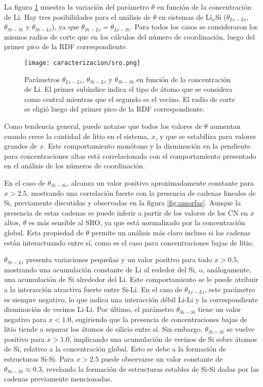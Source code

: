 La figura \ref{fig:sro} muestra la variación del parámetro $\theta$ en función 
de la concentración de Li. Hay tres posibilidades para el análisis de $\theta$ en
sistemas de Li$_x$Si ($\theta_{Li-Li}$, $\theta_{Si-Si}$ y $\theta_{Si-Li}$), ya
que $\theta_{Si-Li} = \theta_{Li-Si}$. Para todos los casos se consideraron los
mismos radios de corte que en los cálculos del número de coordinación, luego del
primer pico de la RDF correspondiente.
\begin{figure}[th]
    \centering
    \texttt{[image: caracterizacion/sro.png]}
    \caption{Parámetros $\theta_{Li-Li}$, $\theta_{Si-Li}$ y $\theta_{Si-Si}$ 
    en función de la concentración de Li. El primer subíndice indica el tipo de
    átomo que se considera como central mientras que el segundo es el vecino. El
    radio de corte se eligió luego del primer pico de la RDF correspondiente.}
    \label{fig:sro}
\end{figure}

Como tendencia general, puede notarse que todos los valores de $\theta$ aumentan
cuando crece la cantidad de litio en el sistema, $x$, y que se estabiliza para 
valores grandes de $x$. Este comportamiento monótono y la disminución en la 
pendiente para concentraciones altas está correlacionado con el comportamiento
presentado en el análisis de los números de coordinación.

En el caso de $\theta_{Si-Si}$, alcanza un valor positivo aproximadamente 
constante para $x > 2.5$, mostrando una correlación fuerte con la presencia de 
cadenas lineales de Si, previamente discutidas y observadas en la figura 
\ref{fig:amorfas}. Aunque la presencia de estas cadenas se puede inferir a partir
de los valores de los CN en $x$ altos, $\theta$ es más sensible al SRO, ya que
está normalizado por la concentración global. Esta propiedad de $\theta$ permite
un análisis más claro incluso si las cadenas están interactuando entre sí, como
es el caso para concentraciones bajas de litio.

$\theta_{Si-Li}$ presenta variaciones pequeñas y un valor positivo para todo 
$x > 0.5$, mostrando una acumulación constante de Li al rededor del Si, o, 
análogamente, una acumulación de Si alrededor del Li. Este comportamiento se le 
puede atribuir a la interacción atractiva fuerte entre Si-Li. En el caso de 
$\theta_{Li-Li}$, este parámetro es siempre negativo, lo que indica una 
interacción débil Li-Li y la correspondiente disminución de vecinos Li-Li. Por
último, el parámetro $\theta_{Si-Si}$ tiene un valor negativo para $x < 1.0$, 
sugiriendo que la presencia de concentraciones bajas de litio tiende a separar 
los átomos de silicio entre sí. Sin embargo, $\theta_{Si-Si}$ se vuelve positivo
para $x > 1.0$, implicando una acumulación de vecinos de Si sobre átomos de Si, 
relativo a la concentración global. Esto se debe a la formación de estructuras 
Si-Si. Para $x > 2.5$ puede observarse un valor constante de 
$\theta_{Si-Si} \approx 0.3$, revelando la formación de estructuras estables de 
Si-Si dadas por las cadenas previamente mencionadas.


